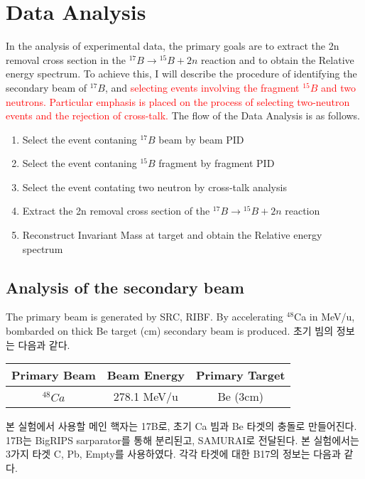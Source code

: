 \chapter{Data Analysis}
In the analysis of experimental data, the primary goals are to extract the 2n removal cross section in the ${}^{17}B \to {}^{15}B + 2n$ reaction and to obtain the Relative energy spectrum. To achieve this, I will describe the procedure of identifying the secondary beam of ${}^{17}B$, and \textcolor{red}{selecting events involving the fragment ${}^{15}B$ and two neutrons. Particular emphasis is placed on the process of selecting two-neutron events and the rejection of cross-talk.} The flow of the Data Analysis is as follows.

\begin{center}
    \begin{enumerate}
        \item Select the event contaning ${}^{17}B$ beam by beam PID
        \item Select the event contaning ${}^{15}B$ fragment by fragment PID
        \item Select the event contating two neutron by cross-talk analysis
        \item Extract the 2n removal cross section of the ${}^{17}B \to {}^{15}B + 2n$ reaction
        \item Reconstruct Invariant Mass at target and obtain the Relative energy spectrum 
    \end{enumerate}
\end{center}

\section{Analysis of the secondary beam}
The primary beam is generated by SRC, RIBF. By accelerating ${}^{48}$Ca in  MeV/u, bombarded on thick Be target (cm) secondary beam is produced. 초기 빔의 정보는 다음과 같다.
\begin{center}
    \begin{tabular}[h]{c|c|c}
        \hline
        Primary Beam & Beam Energy & Primary Target  \\
        \hline
        ${}^{48}Ca$ & 278.1 MeV/u & Be (3cm)\\
        \hline    
    \end{tabular}
\end{center}

본 실험에서 사용할 메인 핵자는 17B로, 초기 Ca 빔과  Be 타겟의 충돌로 만들어진다. 17B는 BigRIPS sarparator를 통해 분리된고, SAMURAI로 전달된다. 본 실험에서는 3가지 타겟 C, Pb, Empty를 사용하였다. 각각 타겟에 대한 B17의 정보는 다음과 같다.

